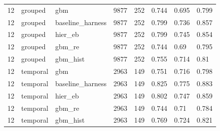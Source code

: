 \begin{tabular}{llllllll}
12 & grouped & gbm & 9877 & 252 & 0.744 & 0.695 & 0.799 \\
12 & grouped & baseline\_harness & 9877 & 252 & 0.799 & 0.736 & 0.857 \\
12 & grouped & hier\_eb & 9877 & 252 & 0.799 & 0.745 & 0.854 \\
12 & grouped & gbm\_re & 9877 & 252 & 0.744 & 0.69 & 0.795 \\
12 & grouped & gbm\_hist & 9877 & 252 & 0.755 & 0.714 & 0.81 \\
12 & temporal & gbm & 2963 & 149 & 0.751 & 0.716 & 0.798 \\
12 & temporal & baseline\_harness & 2963 & 149 & 0.825 & 0.775 & 0.883 \\
12 & temporal & hier\_eb & 2963 & 149 & 0.802 & 0.747 & 0.859 \\
12 & temporal & gbm\_re & 2963 & 149 & 0.744 & 0.71 & 0.784 \\
12 & temporal & gbm\_hist & 2963 & 149 & 0.769 & 0.724 & 0.821 \\
\bottomrule
\end{tabular}
